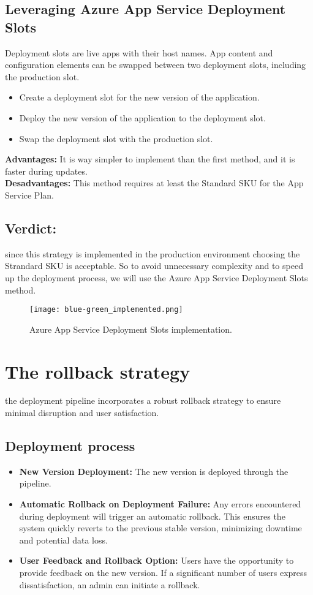 \subsection*{Leveraging Azure App Service Deployment Slots}
Deployment slots are live apps with their host names. App content and configuration elements can be swapped between two deployment slots, including the production slot.
\begin{itemize}
    \item Create a deployment slot for the new version of the application.
    \item Deploy the new version of the application to the deployment slot.
    \item Swap the deployment slot with the production slot.
\end{itemize}
\textbf{Advantages:} It is way simpler to implement than the first method, and it is faster during updates.
\\
\textbf{Desadvantages:} This method requires at least the Standard SKU for the App Service Plan.
\subsection*{Verdict:}
since this strategy is implemented in the production environment choosing the Strandard SKU is acceptable. So to avoid unnecessary complexity and to speed up the deployment process, we will use the Azure App Service Deployment Slots method.
\\
\begin{figure}[htbp]
    \centering
    \texttt{[image: blue-green\_implemented.png]}
    \caption{Azure App Service Deployment Slots implementation.}
    \label{fig:deployment-slots}
\end{figure}

\section{The rollback strategy}
the deployment pipeline incorporates a robust rollback strategy to ensure minimal disruption and user satisfaction.
\subsection*{Deployment process}

\begin{itemize}
    \item \textbf{New Version Deployment:} The new version is deployed through the pipeline.
    \item \textbf{Automatic Rollback on Deployment Failure:} Any errors encountered during deployment will trigger an automatic rollback. This ensures the system quickly reverts to the previous stable version, minimizing downtime and potential data loss.
    \item \textbf{User Feedback and Rollback Option:} Users have the opportunity to provide feedback on the new version. If a significant number of users express dissatisfaction, an admin can initiate a rollback.
\end{itemize}

